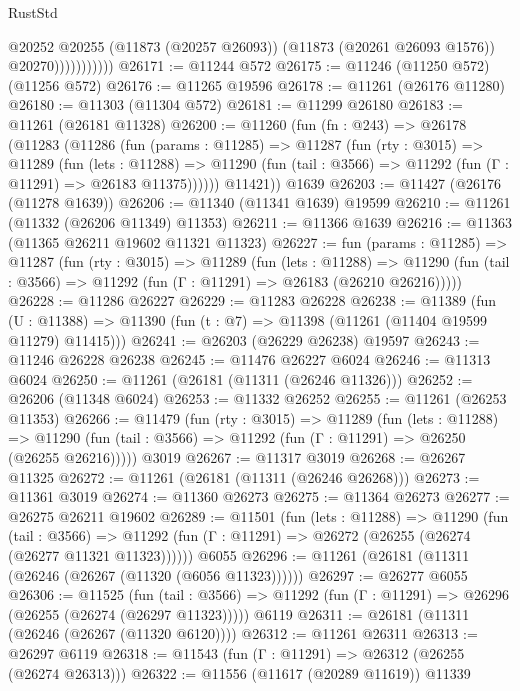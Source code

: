 \begin{lexlean}{RustStd}
\begin{coremodule}
                          @20252
                          @20255
                          (@11873 (@20257 @26093))
                          (@11873 (@20261 @26093 @1576))
                          @20270)))))))))))
@26171 := @11244 @572
@26175 := @11246 (@11250 @572) (@11256 @572)
@26176 := @11265 @19596
@26178 := @11261 (@26176 @11280)
@26180 := @11303 (@11304 @572)
@26181 := @11299 @26180
@26183 := @11261 (@26181 @11328)
@26200 := @11260
    (fun (fn : @243) =>
    @26178
      (@11283
        (@11286
          (fun (params : @11285) =>
          @11287
            (fun (rty : @3015) =>
            @11289
              (fun (lets : @11288) =>
              @11290 (fun (tail : @3566) => @11292 (fun (Γ : @11291) => @26183 @11375))))))
        @11421))
    @1639
@26203 := @11427 (@26176 (@11278 @1639))
@26206 := @11340 (@11341 @1639) @19599
@26210 := @11261 (@11332 (@26206 @11349) @11353)
@26211 := @11366 @1639
@26216 := @11363 (@11365 @26211 @19602 @11321 @11323)
@26227 := fun (params : @11285) =>
  @11287
    (fun (rty : @3015) =>
    @11289
      (fun (lets : @11288) =>
      @11290 (fun (tail : @3566) => @11292 (fun (Γ : @11291) => @26183 (@26210 @26216)))))
@26228 := @11286 @26227
@26229 := @11283 @26228
@26238 := @11389
    (fun (U : @11388) => @11390 (fun (t : @7) => @11398 (@11261 (@11404 @19599 @11279) @11415)))
@26241 := @26203 (@26229 @26238) @19597
@26243 := @11246 @26228 @26238
@26245 := @11476 @26227 @6024
@26246 := @11313 @6024
@26250 := @11261 (@26181 (@11311 (@26246 @11326)))
@26252 := @26206 (@11348 @6024)
@26253 := @11332 @26252
@26255 := @11261 (@26253 @11353)
@26266 := @11479
    (fun (rty : @3015) =>
    @11289
      (fun (lets : @11288) =>
      @11290 (fun (tail : @3566) => @11292 (fun (Γ : @11291) => @26250 (@26255 @26216)))))
    @3019
@26267 := @11317 @3019
@26268 := @26267 @11325
@26272 := @11261 (@26181 (@11311 (@26246 @26268)))
@26273 := @11361 @3019
@26274 := @11360 @26273
@26275 := @11364 @26273
@26277 := @26275 @26211 @19602
@26289 := @11501
    (fun (lets : @11288) =>
    @11290
      (fun (tail : @3566) =>
      @11292 (fun (Γ : @11291) => @26272 (@26255 (@26274 (@26277 @11321 @11323))))))
    @6055
@26296 := @11261 (@26181 (@11311 (@26246 (@26267 (@11320 (@6056 @11323))))))
@26297 := @26277 @6055
@26306 := @11525
    (fun (tail : @3566) => @11292 (fun (Γ : @11291) => @26296 (@26255 (@26274 (@26297 @11323)))))
    @6119
@26311 := @26181 (@11311 (@26246 (@26267 (@11320 @6120))))
@26312 := @11261 @26311
@26313 := @26297 @6119
@26318 := @11543 (fun (Γ : @11291) => @26312 (@26255 (@26274 @26313)))
@26322 := @11556 (@11617 (@20289 @11619)) @11339

\end{coremodule}
\end{lexlean}
